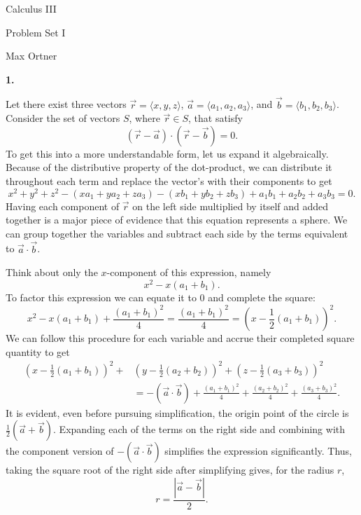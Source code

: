 \documentclass{article}
\newcommand{\qnumber}[1]{
\vspace{0.5cm}
\noindent
\textbf{#1.}
\vspace{4mm}
}
\begin{document}

\begin{center}
    \huge Calculus III
    
    \large Problem Set I

    \normalsize Max Ortner
    \thispagestyle{plain}
\end{center}



\qnumber{1}

\noindent
Let there exist three vectors $\vec{r}=\langle x, y, z \rangle$, $\vec{a}=\langle a_1, a_2, a_3 \rangle$, and $\vec{b}=\langle b_1, b_2, b_3 \rangle$. Consider the set of vectors $S$, where $\vec{r}\in S$, that satisfy
\[
    (\vec{r}-\vec{a}) \cdot (\vec{r}-\vec{b})=0.
\]
To get this into a more understandable form, let us expand it algebraically. Because of the distributive property of the dot-product, we can distribute it throughout each term and replace the vector's with their components to get
\[
    x^2+y^2+z^2 - (xa_1 + ya_2 + za_3) - (xb_1 + yb_2 + zb_3) + a_1b_1 + a_2b_2 + a_3b_3=0.
\]
Having each component of $\vec{r}$ on the left side multiplied by itself and added together is a major piece of evidence that this equation represents a sphere. We can group together the variables and subtract each side by the terms equivalent to $\vec{a}\cdot\vec{b}$.

Think about only the $x$-component of this expression, namely
\[
    x^2-x(a_1+b_1).  
\]
To factor this expression we can equate it to 0 and complete the square:
\[
    x^2-x(a_1+b_1) + \frac{(a_1+b_1)^2}{4} = \frac{(a_1+b_1)^2}{4} = \left( x - \frac{1}{2}(a_1+b_1) \right)^2.
\]
We can follow this procedure for each variable and accrue their completed square quantity to get
\[
\begin{split}
    \left( x - \frac{1}{2}(a_1+b_1) \right)^2 + &\left( y - \frac{1}{2}(a_2+b_2) \right)^2 + \left( z - \frac{1}{2}(a_3+b_3) \right)^2 \\
    &=-(\vec{a}\cdot\vec{b})+\frac{(a_1+b_1)^2}{4}+\frac{(a_2+b_2)^2}{4}+\frac{(a_3+b_3)^2}{4}.
\end{split}
\]
It is evident, even before pursuing simplification, the origin point of the circle is $\frac{1}{2}(\vec{a}+\vec{b})$. Expanding each of the terms on the right side and combining with the component version of $-(\vec{a}\cdot\vec{b})$ simplifies the expression significantly. Thus, taking the square root of the right side after simplifying gives, for the radius $r$,
\[
    r=\frac{|\vec{a}-\vec{b}|}{2}.
\]
\end{document}
